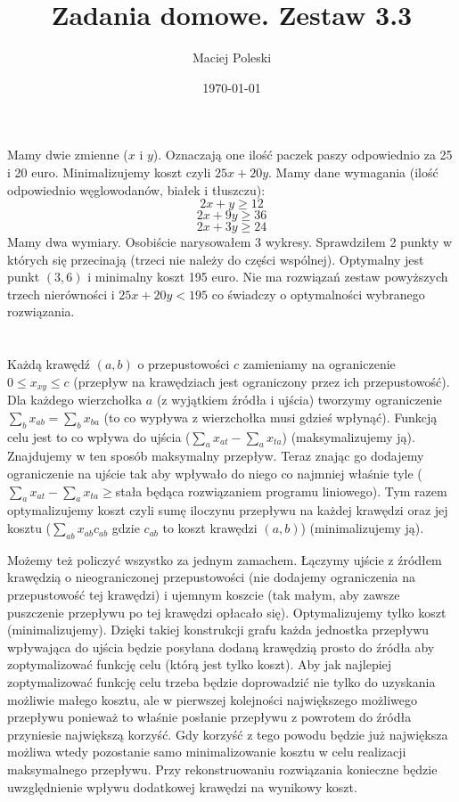 \documentclass[a4paper,12pt]{article}
\title{Zadania domowe. Zestaw 3.3}
\author{Maciej Poleski}
\date{\today}
\begin{document}
\maketitle

\newpage

\section{}
Mamy dwie zmienne ($x$ i $y$). Oznaczają one ilość paczek paszy odpowiednio za 25 i 20 euro. Minimalizujemy koszt czyli $25x + 20y$. Mamy dane wymagania (ilość odpowiednio węglowodanów, białek i tłuszczu):
$$2x+y\geq{12}$$
$$2x+9y\geq{36}$$
$$2x+3y\geq{24}$$
Mamy dwa wymiary. Osobiście narysowałem 3 wykresy. Sprawdziłem 2 punkty w których się przecinają (trzeci nie należy do części wspólnej). Optymalny jest punkt $(3,6)$ i minimalny koszt 195 euro. Nie ma rozwiązań zestaw powyższych trzech nierówności i $25x+20y<195$ co świadczy o optymalności wybranego rozwiązania.

\section{}
Każdą krawędź $(a,b)$ o przepustowości $c$ zamieniamy na ograniczenie $0\leq{x_{xy}}\leq{c}$ (przepływ na krawędziach jest ograniczony przez ich przepustowość). Dla każdego wierzchołka $a$ (z wyjątkiem źródła i ujścia) tworzymy ograniczenie $\sum_{b}x_{ab}=\sum_{b}x_{ba}$ (to co wypływa z wierzchołka musi gdzieś wpłynąć). Funkcją celu jest to co wpływa do ujścia ($\sum_{a}x_{at}-\sum_{a}x_{ta}$) (maksymalizujemy ją). Znajdujemy w ten sposób maksymalny przepływ. Teraz znając go dodajemy ograniczenie na ujście tak aby wpływało do niego co najmniej właśnie tyle ($\sum_{a}x_{at}-\sum_{a}x_{ta}\geq$stała będąca rozwiązaniem programu liniowego). Tym razem optymalizujemy koszt czyli sumę iloczynu przepływu na każdej krawędzi oraz jej kosztu ($\sum_{ab}x_{ab}c_{ab}$ gdzie $c_{ab}$ to koszt krawędzi $(a,b)$) (minimalizujemy ją).

Możemy też policzyć wszystko za jednym zamachem. Łączymy ujście z źródłem krawędzią o nieograniczonej przepustowości (nie dodajemy ograniczenia na przepustowość tej krawędzi) i ujemnym koszcie (tak małym, aby zawsze puszczenie przepływu po tej krawędzi opłacało się). Optymalizujemy tylko koszt (minimalizujemy). Dzięki takiej konstrukcji grafu każda jednostka przepływu wpływająca do ujścia będzie posyłana dodaną krawędzią prosto do źródła aby zoptymalizować funkcję celu (którą jest tylko koszt). Aby jak najlepiej zoptymalizować funkcję celu trzeba będzie doprowadzić nie tylko do uzyskania możliwie małego kosztu, ale w pierwszej kolejności największego możliwego przepływu ponieważ to właśnie posłanie przepływu z powrotem do źródła przyniesie największą korzyść. Gdy korzyść z tego powodu będzie już największa możliwa wtedy pozostanie samo minimalizowanie kosztu w celu realizacji maksymalnego przepływu. Przy rekonstruowaniu rozwiązania konieczne będzie uwzględnienie wpływu dodatkowej krawędzi na wynikowy koszt.
\end{document}

